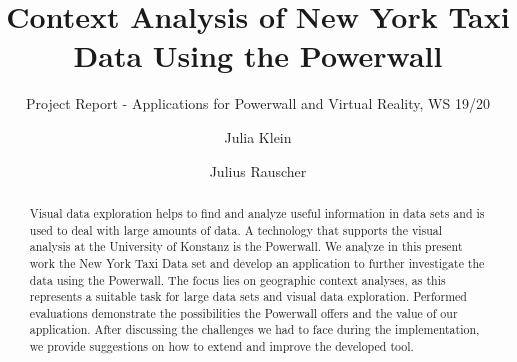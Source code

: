 \documentclass[sigconf, authorversion, nonacm=true]{acmart}
\begin{document}
\title{Context Analysis of New York Taxi Data Using the Powerwall}
\subtitle{Project Report - Applications for Powerwall and Virtual Reality, WS 19/20}

\author{Julia Klein}
\author{Julius Rauscher}



\begin{abstract}

Visual data exploration helps to find and analyze useful information in data sets and is used to deal with large amounts of data. A technology that supports the visual analysis at the University of Konstanz is the Powerwall. We analyze in this present work the New York Taxi Data set and develop an application to further investigate the data using the Powerwall. The focus lies on geographic context analyses, as this represents a suitable task for large data sets and visual data exploration. Performed evaluations demonstrate the possibilities the Powerwall offers and the value of our application. After discussing the challenges we had to face during the implementation, we provide suggestions on how to extend and improve the developed tool.


\end{abstract}


\keywords{}






\maketitle
\end{document}
